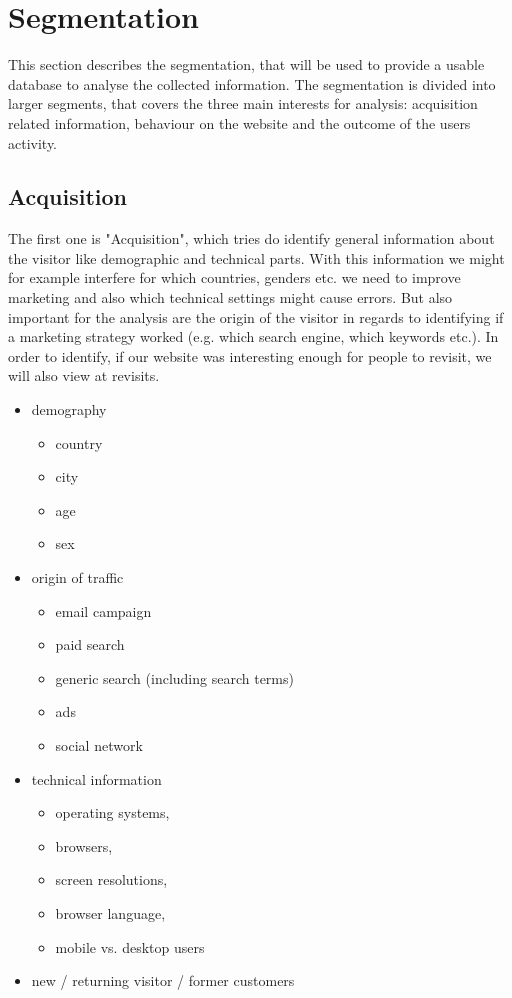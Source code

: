 \section{Segmentation}
\label{sec:Segmentation}

This section describes the segmentation, that will be used to provide a usable database to analyse the collected information. The segmentation is divided into larger segments, that covers the three main interests for analysis: acquisition related information, behaviour on the website and the outcome of the users activity.

\subsection{Acquisition}
The first one is "Acquisition", which tries do identify general information about the visitor like demographic and technical parts. With this information we might for example interfere for which countries, genders etc. we need to improve marketing and also which technical settings might cause errors. But also important for the analysis are the origin of the visitor in regards to identifying if a marketing strategy worked (e.g. which search engine, which keywords etc.). In order to identify, if our website was interesting enough for people to revisit, we will also view at revisits.

\begin{itemize}
\item demography
\begin{itemize}
\item country
\item city 
\item age 
\item sex
\end{itemize}
\item origin of traffic 
\begin{itemize}
\item email campaign
\item paid search
\item generic search (including search terms)
\item ads
\item social network
\end{itemize}
\item technical information 
\begin{itemize}
\item operating systems, 
\item browsers, 
\item screen resolutions, 
\item browser language,
\item mobile vs. desktop users 
\end{itemize}
\item new / returning visitor /  former customers  
\end{itemize}

